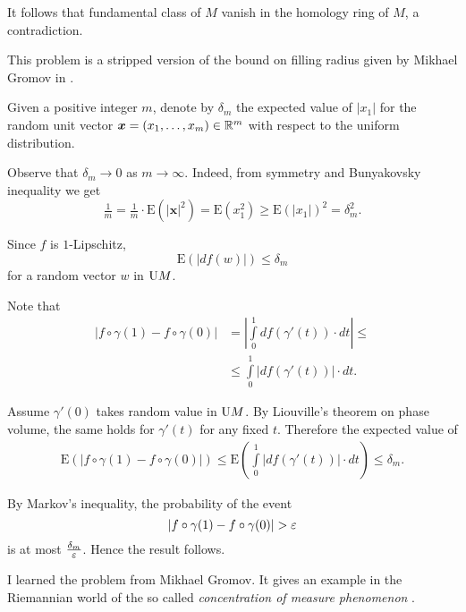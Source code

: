 It follows that fundamental class of $M$ vanish in the homology ring of $M$, 
a contradiction. 
\qeds


This problem is a stripped version of the bound on filling radius given by Mikhael Gromov in \cite{gromov-filling}.  

Given a positive integer $m$,
denote by $\delta_m$ 
the expected value of $|x_1|$ for the random unit vector 
$\bm{x}\z=(x_1,\dots,x_m)\z\in\RR^m$ 
with respect to the uniform distribution.

Observe that $\delta_m\to 0$ as $m\to\infty$.
Indeed, from symmetry and Bunyakovsky inequality we get
\[
\tfrac1m=\tfrac1m\cdot\mathrm{E}(|\bm{x}|^2)
=\mathrm{E}(x_1^2)\ge \mathrm{E}(|x_1|)^2=\delta_m^2.
\]

Since $f$ is $1$-Lipschitz,
\[\mathrm{E}(|df(w)|)\le\delta_m\]
for a random vector $w$ in $\mathrm{U} M$.


Note that 
\begin{align*}
|f\circ \gamma(1)-f\circ\gamma(0)|
&=
\left|\int\limits_0^1df(\gamma'(t))\cdot dt\right|\le \\
&\le \int\limits_0^1\left|df(\gamma'(t))\right|\cdot dt.
\end{align*}

Assume $\gamma'(0)$
takes random value in $\mathrm{U} M$.
By Liouville's theorem on phase volume, the same holds for $\gamma'(t)$
for any fixed $t$.
Therefore
the expected value of
\begin{align*}
\mathrm{E}(|f\circ \gamma(1)-f\circ\gamma(0)|)\le \mathrm{E}\left(\int\limits_0^1|df(\gamma'(t))|\cdot dt\right)\le\delta_m.
\end{align*}

By Markov's inequality,
the probability of the event 
\[|f\circ \gamma(1)-f\circ\gamma(0)|>\eps\]
is at most $\tfrac{\delta_m}{\varepsilon}$.
Hence the result follows.
\qeds

I learned the problem from Mikhael Gromov.
It gives an example in the Riemannian world
of the so called 
\emph{concentration of measure phenomenon}
\cite[see][]{milman-schechtman,ledoux}.
 
